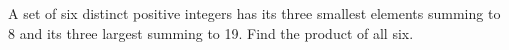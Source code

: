 A set of six distinct positive integers has its three smallest elements summing to 8 and its three largest summing to 19. Find the product of all six.
